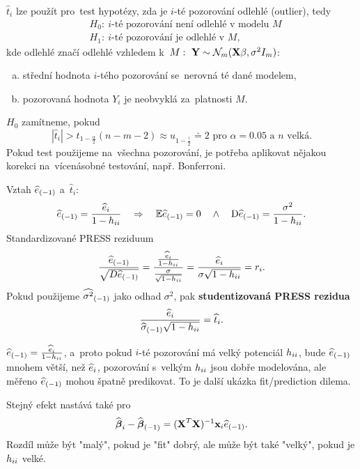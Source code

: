 \begin{remark}
	$\widehat{t}_i$ lze použít pro~test hypotézy, zda je $i$-té pozorování odlehlé (outlier), tedy
	\[
	\begin{split}
	&H_0:~i\text{-té pozorování není odlehlé v~modelu }M\\
	&H_1:~i\text{-té pozorování je odlehlé v~}M,
	\end{split}
	\] kde odlehlé značí odlehlé vzhledem k~$M:~\textbf{Y}\sim\mathcal{N}_m(\textbf{X}\beta,\sigma^2 I_m)$:\begin{enumerate}[a)]
		\item střední hodnota $i$-tého pozorování se~nerovná té dané modelem,
		\item pozorovaná hodnota $Y_i$ je neobvyklá za~platnosti $M$.
	\end{enumerate}
$H_0$ zamítneme, pokud $$ |\widehat{t}_i|>t_{1-\frac{\alpha}{2}}(n-m-2)\approx u_{1-\frac{\lparen}{2}}\doteq 2\text{ pro~}\alpha=0.05\text{ a~}n\text{ velká}.$$
Pokud test použijeme na~všechna pozorování, je potřeba aplikovat nějakou korekci na~vícenásobné testování, např. Bonferroni.
\end{remark}
\begin{remark}
	Vztah ${\widehat{e}_{(-1)}}$ a~$\widehat{t}_i$:
	$$ {\widehat{e}_{(-1)}}=\frac{\widehat{e}_i}{1-h_{ii}}\quad\Rightarrow\quad\mathbb{E}{\widehat{e}_{(-1)}}=0\quad\wedge\quad \mathrm{D} {\widehat{e}_{(-1)}}=\frac{\sigma^2}{1-h_{ii}}.$$
	Standardizované PRESS reziduum $$\frac{{\widehat{e}_{(-1)}}}{\sqrt{D{\widehat{e}_{(-1)}}}}=\frac{\frac{\widehat{e}_i}{1-h_{ii}}}{\frac{\sigma}{\sqrt{1-h_{ii}}}}=\frac{\widehat{e}_i}{\sigma\sqrt{1-h_{ii}}}=r_i.$$
	Pokud použijeme ${\widehat{{\sigma}^2}_{(-1)}}$ jako odhad $\sigma^2$, pak \textbf{studentizovaná PRESS rezidua} $$\frac{\widehat{e}_i}{{\widehat{{\sigma}}_{(-1)}}\sqrt{1-h_{ii}}}=\widehat{t}_i.$$
\end{remark}
\begin{remark}
	${\widehat{e}_{(-1)}}=\frac{\widehat{e}_i}{1-h_{ii}}$, a~proto pokud $i$-té pozorování má velký potenciál $h_{ii}$, bude ${\widehat{e}_{(-1)}}$ mnohem větší, než $\widehat{e}_i$, pozorování s~velkým $h_{ii}$ jsou dobře modelována, ale měřeno ${\widehat{e}_{(-1)}}$ mohou špatně predikovat. To je další ukázka fit/prediction dilema.
	
	Stejný efekt nastává také pro~
	$$ \widehat{\boldsymbol{\beta}}_i-{\widehat{\boldsymbol{\beta}}_{(-1)}}=(\textbf{X}^T\textbf{X})^{-1}\textbf{x}_i{\widehat{e}_{(-1)}}.$$
	Rozdíl může být "malý", pokud je "fit" dobrý, ale může být také "velký", pokud je $h_{ii}$ velké.
\end{remark}

